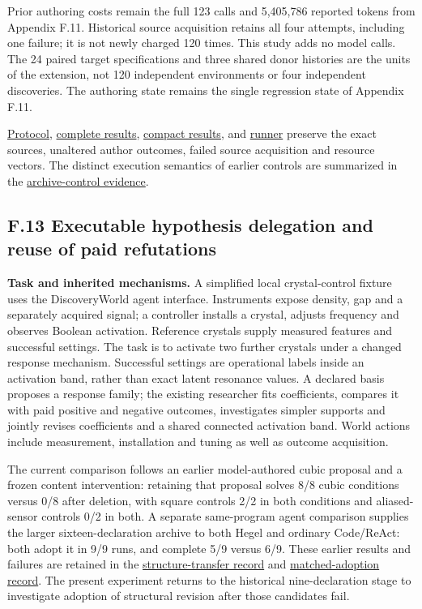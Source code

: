 \documentclass[twoside,11pt]{article}
\begin{document}
Prior authoring costs remain the full 123 calls and 5,405,786 reported tokens from Appendix F.11. Historical source acquisition retains all four attempts, including one failure; it is not newly charged 120 times. This study adds no model calls. The 24 paired target specifications and three shared donor histories are the units of the extension, not 120 independent environments or four independent discoveries. The authoring state remains the single regression state of Appendix F.11.


\hyperlink{artifact-100}{Protocol}, \hyperlink{artifact-101}{complete results}, \hyperlink{artifact-102}{compact results}, and \hyperlink{artifact-103}{runner} preserve the exact sources, unaltered author outcomes, failed source acquisition and resource vectors. The distinct execution semantics of earlier controls are summarized in the \hyperlink{artifact-104}{archive-control evidence}.


\subsection*{F.13 Executable hypothesis delegation and reuse of paid refutations}

\textbf{Task and inherited mechanisms.} A simplified local crystal-control fixture uses the DiscoveryWorld agent interface. Instruments expose density, gap and a separately acquired signal; a controller installs a crystal, adjusts frequency and observes Boolean activation. Reference crystals supply measured features and successful settings. The task is to activate two further crystals under a changed response mechanism. Successful settings are operational labels inside an activation band, rather than exact latent resonance values. A declared basis proposes a response family; the existing researcher fits coefficients, compares it with paid positive and negative outcomes, investigates simpler supports and jointly revises coefficients and a shared connected activation band. World actions include measurement, installation and tuning as well as outcome acquisition.


The current comparison follows an earlier model-authored cubic proposal and a frozen content intervention: retaining that proposal solves 8/8 cubic conditions versus 0/8 after deletion, with square controls 2/2 in both conditions and aliased-sensor controls 0/2 in both. A separate same-program agent comparison supplies the larger sixteen-declaration archive to both Hegel and ordinary Code/ReAct: both adopt it in 9/9 runs, and complete 5/9 versus 6/9. These earlier results and failures are retained in the \hyperlink{artifact-105}{structure-transfer record} and \hyperlink{artifact-106}{matched-adoption record}. The present experiment returns to the historical nine-declaration stage to investigate adoption of structural revision after those candidates fail.
\end{document}
